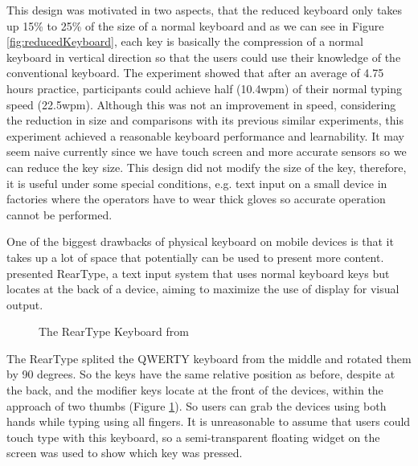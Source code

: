 \documentclass[11pt]{article}
\begin{document}
This design was motivated in two aspects, that the reduced keyboard only takes up 15\% to 25\% of the size of a normal keyboard and as we can see in Figure \ref{fig:reducedKeyboard}, each key is basically the compression of a normal keyboard in vertical direction so that the users could use their knowledge of the conventional keyboard. The experiment showed that after an average of 4.75 hours practice, participants could achieve half (10.4wpm) of their normal typing speed (22.5wpm). Although this was not an improvement in speed, considering the reduction in size and comparisons with its previous similar experiments, this experiment achieved a reasonable keyboard performance and learnability. It may seem naive currently since we have touch screen and more accurate sensors so we can reduce the key size. This design did not modify the size of the key, therefore, it is useful under some special conditions, e.g. text input on a small device in factories where the operators have to wear thick gloves so accurate operation cannot be performed. 

One of the biggest drawbacks of physical keyboard on mobile devices is that it takes up a lot of space that potentially can be used to present more content. \citet{scott2010reartype} presented RearType, a text input system that uses normal keyboard keys but locates at the back of a device, aiming to maximize the use of display for visual output. 
\begin{figure}[H]
\centering
{}\hfill
{}\hfill
\caption{The RearType Keyboard from \citep{scott2010reartype}} \label{fig:rearType}
\end{figure}
The RearType splited the QWERTY keyboard from the middle and rotated them by 90 degrees. So the keys have the same relative position as before, despite at the back, and the modifier keys locate at the front of the devices, within the approach of two thumbs (Figure \ref{fig:rearType}). So users can grab the devices using both hands while typing using all fingers. It is unreasonable to assume that users could touch type with this keyboard, so a semi-transparent floating widget on the screen was used to show which key was pressed.
\end{document}
